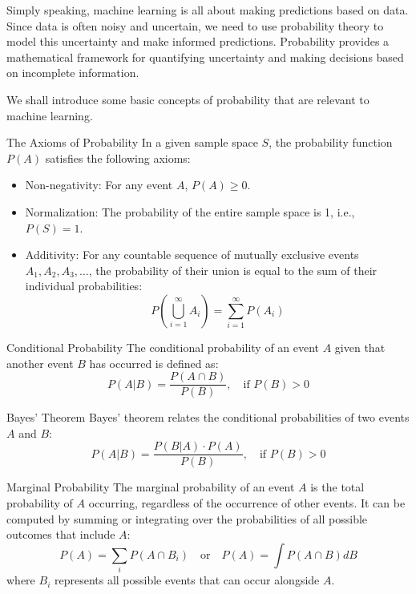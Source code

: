 Simply speaking, machine learning is all about making predictions based on data. Since data is often noisy and uncertain, we need to use probability theory to model this uncertainty and make informed predictions. Probability provides a mathematical framework for quantifying uncertainty and making decisions based on incomplete information.

We shall introduce some basic concepts of probability that are relevant to machine learning.

\begin{definition}{The Axioms of Probability}
In a given sample space \(S\), the probability function \(P(A)\) satisfies the following axioms:
\begin{itemize}
    \item Non-negativity: For any event \(A\), \(P(A) \geq 0\).
    \item Normalization: The probability of the entire sample space is 1, i.e., \(P(S) = 1\).
    \item Additivity: For any countable sequence of mutually exclusive events \(A_1, A_2, A_3, \ldots\), the probability of their union is equal to the sum of their individual probabilities:
    \[P\left(\bigcup_{i=1}^{\infty} A_i\right) = \sum_{i=1}^{\infty} P(A_i)\]
\end{itemize}
\end{definition}

\begin{definition}{Conditional Probability}
The conditional probability of an event \(A\) given that another event \(B\) has occurred is defined as:
\[
P(A|B) = \frac{P(A \cap B)}{P(B)}, \quad \text{if } P(B) > 0
\]
\end{definition}

\begin{definition}{Bayes' Theorem}
Bayes' theorem relates the conditional probabilities of two events \(A\) and \(B\):
\[
P(A|B) = \frac{P(B|A) \cdot P(A)}{P(B)}, \quad \text{if } P(B) > 0
\]
\end{definition}

\begin{definition}{Marginal Probability}
The marginal probability of an event \(A\) is the total probability of \(A\) occurring, regardless of the occurrence of other events. It can be computed by summing or integrating over the probabilities of all possible outcomes that include \(A\):
\[
P(A) = \sum_{i} P(A \cap B_i) \quad \text{or} \quad P(A) = \int P(A \cap B) dB
\]
where \(B_i\) represents all possible events that can occur alongside \(A\).
\end{definition}

